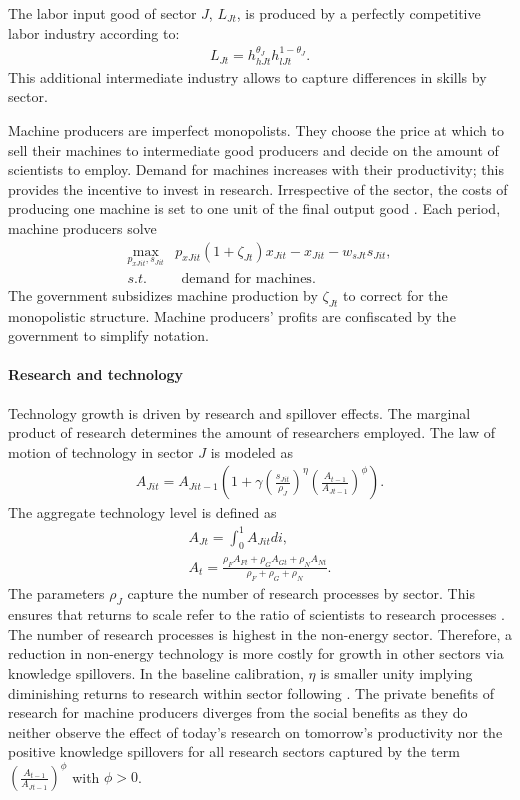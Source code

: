 The labor input good of sector $J$, $L_{Jt}$, is produced by a perfectly competitive labor industry according to: 
\begin{align}
L_{Jt}=h_{hJt}^{\theta_J}h_{lJt}^{1-\theta_J}.
\end{align}
This additional intermediate industry allows to capture differences in skills by sector.

Machine producers are imperfect monopolists. They choose the price at which to sell their machines to intermediate good producers and decide on the amount of scientists to employ. Demand for machines increases with their productivity; this provides the incentive to invest in research. Irrespective of the sector, the costs of producing one machine is set to one unit of the final output good \citep[similar to][]{Fried2018ClimateAnalysis, Acemoglu2012TheChange}.
Each period, machine producers solve
\begin{align}
\underset{p_{xJit}, s_{Jit}}{\max}&p_{xJit}(1+\zeta_{Jt})x_{Jit}-x_{Jit}-w_{sJt}s_{Jit},\\
s.t.&\ \ \text{demand for machines}.
\end{align}
The government subsidizes machine production by $\zeta_{Jt}$ to correct for the monopolistic structure. Machine producers' profits are confiscated by the government to simplify notation.

\paragraph{Research and technology}
Technology growth is driven by research and spillover effects. The marginal product of research determines the amount of researchers employed.
The law of motion of technology in sector $J$ is modeled as
\begin{align}
A_{Jit}=A_{Jit-1}\left(1+\gamma\left(\frac{s_{Jit}}{\rho_J}\right)^\eta\left(\frac{A_{t-1}}{A_{Jt-1}}\right)^\phi\right).
\end{align}
The aggregate technology level is defined as
\begin{align}
A_{Jt}=\int_{0}^{1}A_{Jit}di,\\
A_{t}=\frac{\rho_FA_{Ft}+\rho_GA_{Gt}+\rho_N A_{Nt}}{\rho_F+\rho_G+\rho_N}.
\end{align}
The parameters $\rho_J$ capture the number of research processes by sector. This ensures that returns to scale refer to the ratio of scientists to research processes \citep{Fried2018ClimateAnalysis}. 
The number of research processes is highest in the non-energy sector. Therefore, a reduction in non-energy technology is more costly for growth in other sectors via knowledge spillovers. 
In the baseline calibration, $\eta$ is smaller unity implying diminishing returns to research within sector following \cite{Fried2018ClimateAnalysis}. 
The private benefits of research for machine producers diverges from the social benefits as they do neither observe the effect of today's research on tomorrow's productivity nor the positive knowledge spillovers for all research sectors captured by the term $\left(\frac{A_{t-1}}{A_{Jt-1}}\right)^\phi$ with $\phi>0$. 

